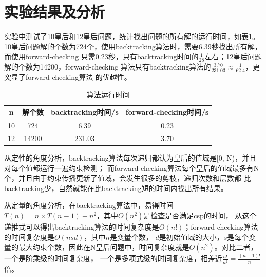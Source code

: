 \documentclass[10pt,letterpaper]{ctexart}
\newcommand{\tabref}[1]{表\ref{#1}}
\begin{document}
\section{实验结果及分析}
实验中测试了10皇后和12皇后问题，统计找出问题的所有解的运行时间，如\tabref{tab:time}。
10皇后问题解的个数为724个，使用backtracking算法时，需要6.39秒找出所有解，而使用forward-checking
只需0.23秒，只有backtracking时间的$\frac{1}{28}$左右；12皇后问题解的个数为14200，forward-checking
算法只有backtracking算法的$\frac{3.70}{231.03}\approx \frac{1}{62.4}$，更突显了forward-checking算法
的优越性。
\begin{table}[!htbp]
  \centering
  \begin{tabular}{cccc}
    \toprule  
    n& 解个数& backtracking时间/s& forward-checking时间/s\\
    \midrule  
    10& 724& 6.39& 0.23\\
    12& 14200& 231.03& 3.70\\
    \bottomrule 
  \end{tabular}
  \caption{算法运行时间}
  \label{tab:time}
\end{table}
\par 从定性的角度分析，backtracking算法每次递归都认为皇后的值域是[0, N)，并且对每个值都运行一遍约束检测；
而forward-checking算法每个皇后的值域最多有N个，并且由于约束传播更新了值域，会发生很多的剪枝，递归次数和层数都
比backtracking少，自然就能在比backtracking短的时间内找出所有结果。
\par 从定量的角度分析，在backtracking算法中，易得时间$T(n) = n\times T(n-1) + n^2$，其中$O(n^2)$是检查是否满足csp的时间，
从这个递推式可以得出backtracking算法的时间复杂度是$O(n!)$；forward-checking算法的时间复杂度是$O(nsd)$，其中$n$是变量个数，
$d$是初始值域的大小，$s$是每个变量的最大约束个数，因此在N皇后问题中，时间复杂度就是$O(n^2)$。对比二者，一个是阶乘级的时间复杂度，
一个是多项式级的时间复杂度，相差近$\frac{n!}{n^2}=\frac{(n-1)!}{n}$倍。
\end{document}
